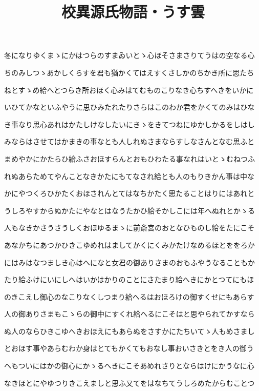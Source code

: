 \documentclass[a4paper,11pt,landscape]{ltjtarticle}
\title{校異源氏物語・うす雲}
\date{}
\begin{document}
\maketitle

冬になりゆくまゝにかはつらのすまゐいとゝ心ほそさまさりてうはの空なる心
\par\medskip
ちのみしつゝあかしくらすを君も猶かくてはえすくさしかのちかき所に思たち
\par\medskip
ねとすゝめ給へとつらき所おほく心みはてむものこりなき心ちすへきをいかに
\par\medskip
いひてかなといふやうに思ひみたれたりさらはこのわか君をかくてのみはひな
\par\medskip
き事なり思心あれはかたしけなしたいにきゝをきてつねにゆかしかるをしはし
\par\medskip
みならはさせてはかまきの事なとも人しれぬさまならすしなさんとなむ思ふと
\par\medskip
まめやかにかたらひ給ふさおほすらんとおもひわたる事なれはいとゝむねつふ
\par\medskip
れぬあらためてやんことなきかたにもてなされ給とも人のもりきかん事は中な
\par\medskip
かにやつくろひかたくおほされんとてはなちかたく思たることはりにはあれと
\par\medskip
うしろやすからぬかたにやなとはなうたかひ給そかしこには年へぬれとかゝる
\par\medskip
人もなきかさうさうしくおほゆるまゝに前斎宮のおとなひものし給をたにこそ
\par\medskip
あなかちにあつかひきこゆめれはましてかくにくみかたけなめるほとををろか
\par\medskip
にはみはなつましき心はへになと女君の御ありさまのおもふやうなることもか
\par\medskip
たり給ふけにいにしへはいかはかりのことにさたまり給へきにかとつてにもほ
\par\medskip
のきこえし御心のなこりなくしつまり給へるはおほろけの御すくせにもあらす
\par\medskip
人の御ありさまもこゝらの御中にすくれ給へるにこそはと思やられてかすなら
\par\medskip
ぬ人のならひきこゆへきおほえにもあらぬをさすかにたちいてゝ人もめさまし
\par\medskip
とおほす事やあらむわか身はとてもかくてもおなし事おいさきとをき人の御う
\par\medskip
へもついにはかの御心にかゝるへきにこそあめれさりとならはけにかうなに心
\par\medskip
なきほとにやゆつりきこえましと思ふ又てをはなちてうしろめたからむことつ
\end{document}
